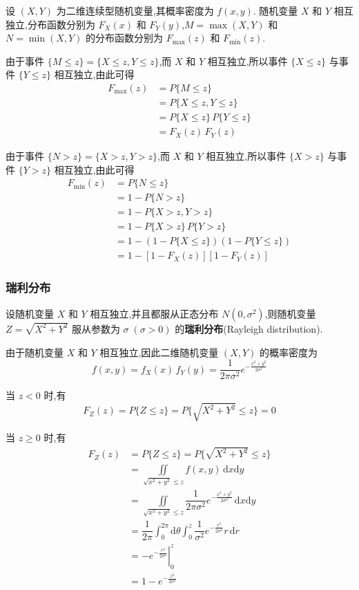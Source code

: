 设 $(X,Y)$ 为二维连续型随机变量,其概率密度为 $f(x,y)$. 随机变量 $X$ 和 $Y$ 相互独立,分布函数分别为 $F_{X}(x)$ 和 $F_{Y}(y)$,$M = \max(X,Y)$ 和 $N = \min(X,Y)$ 的分布函数分别为 $F_{\text{max}}(z)$ 和 $F_{\text{min}}(z)$.

由于事件 $\{M \leqslant z\} = \{X \leqslant z, Y \leqslant z\}$,而 $X$ 和 $Y$ 相互独立,所以事件 $\{X \leqslant z\}$ 与事件 $\{Y \leqslant z\}$ 相互独立,由此可得
$$
\begin{aligned}
    F_{\text{max}}(z) &= P\{M \leqslant z\} \\
    &= P\{X \leqslant z, Y \leqslant z\} \\
    &= P\{X \leqslant z\} \, P\{Y \leqslant z\} \\
    &= F_{X}(z) \, F_{Y}(z)
\end{aligned}
$$

由于事件 $\{N>z\} = \{X>z, Y>z\}$,而 $X$ 和 $Y$ 相互独立,所以事件 $\{X>z\}$ 与事件 $\{Y>z\}$ 相互独立,由此可得
$$
\begin{aligned}
    F_{\text{min}}(z) &= P\{N \leqslant z\} \\
    &= 1 - P\{N>z\} \\
    &= 1 - P\{X>z, Y>z\} \\
    &= 1 - P\{X>z\} \, P\{Y>z\} \\
    &= 1 - (1 - P\{X \leqslant z\})(1 - P\{Y \leqslant z\}) \\
    &= 1 - [1 - F_{X}(z)][1 - F_{Y}(z)]
\end{aligned}
$$

\subsubsection{瑞利分布}

设随机变量 $X$ 和 $Y$ 相互独立,并且都服从正态分布 $N(0, \sigma^2)$,则随机变量 $Z = \sqrt{X^2 + Y^2}$ 服从参数为 $\sigma \; (\sigma > 0)$ 的\textbf{瑞利分布}(Rayleigh distribution).

由于随机变量 $X$ 和 $Y$ 相互独立,因此二维随机变量 $(X,Y)$ 的概率密度为
$$
f(x,y) = f_{X}(x) \, f_{Y}(y) = \dfrac{1}{2 \pi \sigma^2} e^{-\frac{x^2 + y^2}{2 \sigma^2}}
$$

当 $z<0$ 时,有
$$
F_{Z}(z) = P\{Z \leqslant z\} = P\{\sqrt{X^2 + Y^2} \leqslant z\} = 0
$$

当 $z \geqslant 0$ 时,有
$$
\begin{aligned}
    F_{Z}(z) &= P\{Z \leqslant z\} = P\{\sqrt{X^2 + Y^2} \leqslant z\} \\
    &= \underset{\sqrt{x^2 + y^2} \leqslant z}{\iint} f(x,y) \, \text{d}x \text{d}y \\
    &= \underset{\sqrt{x^2 + y^2} \leqslant z}{\iint} \dfrac{1}{2 \pi \sigma^2} e^{-\frac{x^2 + y^2}{2 \sigma^2}} \, \text{d}x \text{d}y \\
    &= \dfrac{1}{2 \pi} \int_0^{2 \pi} \text{d}\theta \int_0^z \dfrac{1}{\sigma^2} e^{-\frac{r^2}{2 \sigma^2}} r \, \text{d}r \\
    &= \left. -e^{-\frac{r^2}{2 \sigma^2}} \right|_0^z \\
    &= 1 - e^{-\frac{z^2}{2 \sigma^2}}
\end{aligned}
$$

